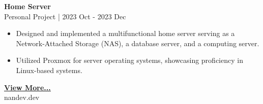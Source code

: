 \documentclass[11pt,a4paper]{article}
\begin{document}
\begin{minipage}[t]{18cm}
\begin{minipage}[t]{17cm}
\vspace{0.4cm}

\textbf{Home Server}\\
{\small Personal Project | 2023 Oct - 2023 Dec}
\begin{itemize}[leftmargin=*, nosep, itemsep=2pt, topsep=2pt]
    \item Designed and implemented a multifunctional home server serving as a Network-Attached Storage (NAS), a database server, and a computing server.
    \item Utilized Proxmox for server operating systems, showcasing proficiency in Linux-based systems.
\end{itemize}

\end{minipage}

\vspace{1cm}

\begin{center}
\href{https://nandev.dev}{\bfseries\color{accent}\underline{View More...}}\\[4pt]
{\small nandev.dev}
\end{center}

\end{minipage}
\end{document}
